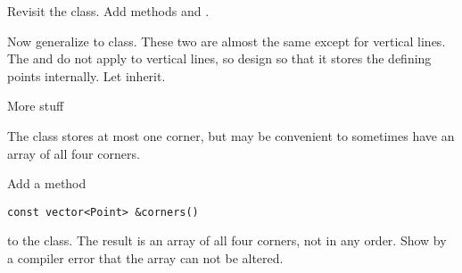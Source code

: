 \begin{exercise}
  \label{ex:geom:line3}
  Revisit the  class.
  Add methods  and .

  Now generalize  to 
  class. These two are almost the same except for vertical lines.
  The  and  do not apply to vertical lines, so
  design  so that it stores the defining points
  internally. Let  inherit.
\end{exercise}

 {More stuff}

\prerequisite{\ref{sec:class-ref}}

The  class stores at most one corner, but may be
convenient to sometimes have an array of all four corners.

\begin{exercise}
  \label{ex:geom:corners}
  Add a method
\begin{verbatim}
const vector<Point> &corners()
\end{verbatim}
to the  class. The result is an array of all four
corners, not in any order. Show by a compiler error that the array can
not be altered.
\end{exercise}
